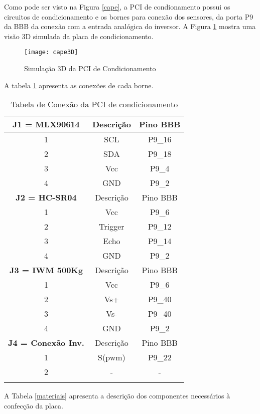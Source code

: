 	Como pode ser visto na Figura \ref{cape}, a PCI de condionamento possui os circuitos de condicionamento e os bornes para conexão dos sensores, da porta P9 da BBB da conexão com a entrada analógica do inversor. A Figura \ref{cape3D} mostra uma  visão 3D simulada da placa de condicionamento.

	\begin{figure}[!h]
		\centering
		\texttt{[image: cape3D]}
		\caption{Simulação 3D da PCI de Condicionamento}
		\label{cape3D}
	\end{figure}

	A tabela \ref{conexao} apresenta as conexões de cada borne. 

	\newpage
	\begin{table}[!h]
	\centering
	\caption{Tabela de Conexão da PCI de condicionamento}
	\begin{tabular}{ c c c }
	\hline
	\textbf{J1 = MLX90614}	& Descrição & Pino BBB\\
	\hline
	1		&	SCL &	P9\_16\\
	\hline
	2		&	SDA &	P9\_18\\
	\hline
	3		&	Vcc &	P9\_4\\
	\hline
	4		&	GND &	P9\_2\\
	\hline
	\textbf{J2 = HC-SR04}	& Descrição & Pino BBB\\
	\hline
	1		&	Vcc &	P9\_6\\
	\hline
	2		&	Trigger &	P9\_12\\
	\hline
	3		&	Echo &	P9\_14\\
	\hline
	4		&	GND &	P9\_2\\
	\hline
	\textbf{J3 = IWM 500Kg}	& Descrição & Pino BBB\\
	\hline
	1		&	Vcc &	P9\_6\\
	\hline
	2		&	Vs+ &	P9\_40\\
	\hline
	3		&	Vs- &	P9\_40\\
	\hline
	4		&	GND &	P9\_2\\
	\hline
	\textbf{J4 = Conexão Inv.}	& Descrição & Pino BBB\\
	\hline
	1		&	S(pwm) &	P9\_22\\
	\hline
	2		&	- &	-\\
	\hline


	\label{conexao}
	\end{tabular}
	\end{table}


	A Tabela \ref{materiais} apresenta a descrição dos componentes necessários à confecção da placa.

